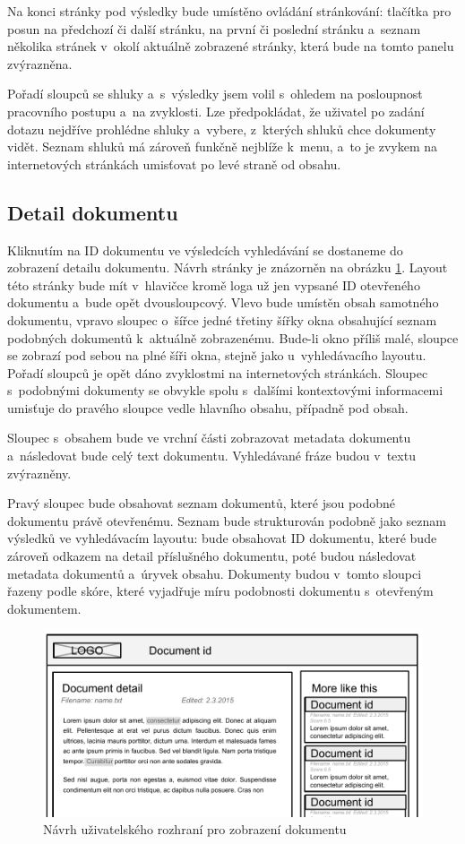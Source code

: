 Na konci stránky pod výsledky bude umístěno ovládání stránkování: tlačítka pro posun na předchozí či další stránku, na první či poslední stránku a~seznam několika stránek v~okolí aktuálně zobrazené stránky, která bude na tomto panelu zvýrazněna.

Pořadí sloupců se shluky a~s~výsledky jsem volil s~ohledem na posloupnost pracovního postupu a~na zvyklosti. Lze předpokládat, že uživatel po zadání dotazu nejdříve prohlédne shluky a~vybere, z~kterých shluků chce dokumenty vidět. Seznam shluků má zároveň funkčně nejblíže k~menu, a~to je zvykem na internetových stránkách umisťovat po levé straně od obsahu.

\subsection{Detail dokumentu}
Kliknutím na ID dokumentu ve výsledcích vyhledávání se dostaneme do zobrazení detailu dokumentu. Návrh stránky je znázorněn na obrázku \ref{fig:DetailLayout}. Layout této stránky bude mít v~hlavičce kromě loga už jen vypsané ID otevřeného dokumentu a~bude opět dvousloupcový. Vlevo bude umístěn obsah samotného dokumentu, vpravo sloupec o~šířce jedné třetiny šířky okna obsahující seznam podobných dokumentů k~aktuálně zobrazenému. Bude-li okno příliš malé, sloupce se zobrazí pod sebou na plné šíři okna, stejně jako u~vyhledávacího layoutu. Pořadí sloupců je opět dáno zvyklostmi na internetových stránkách. Sloupec s~podobnými dokumenty se obvykle spolu s~dalšími kontextovými informacemi umisťuje  do pravého sloupce vedle hlavního obsahu, případně pod obsah.

Sloupec s~obsahem bude ve vrchní části zobrazovat metadata dokumentu a~následovat bude celý text dokumentu. Vyhledávané fráze budou v~textu zvýrazněny. 

Pravý sloupec bude obsahovat seznam dokumentů, které jsou podobné dokumentu právě otevřenému. Seznam bude strukturován podobně jako seznam výsledků ve vyhledávacím layoutu: bude obsahovat ID dokumentu, které bude zároveň odkazem na detail příslušného dokumentu, poté budou následovat metadata dokumentů a~úryvek obsahu. Dokumenty budou v~tomto sloupci řazeny podle skóre, které vyjadřuje míru podobnosti dokumentu s~otevřeným dokumentem.

\begin{figure}[h]
\begin{center}
\includegraphics[width=13cm]{DetailLayout}
\caption{Návrh uživatelského rozhraní pro zobrazení dokumentu}
\label{fig:DetailLayout}
\end{center}
\end{figure}